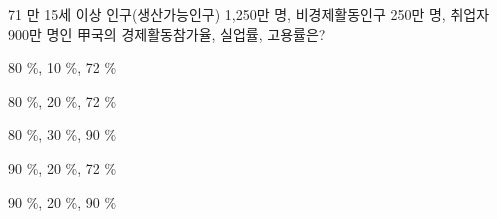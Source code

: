 \begin{question}{71}
만 15세 이상 인구(생산가능인구) 1,250만 명, 비경제활동인구 250만 명, 취업자 900만 명인 甲국의 경제활동참가율, 실업률, 고용률은?
\begin{choices}
  \item 80 \%, 10 \%, 72 \%
  \item 80 \%, 20 \%, 72 \%
  \item 80 \%, 30 \%, 90 \%
  \item 90 \%, 20 \%, 72 \%
  \item 90 \%, 20 \%, 90 \%
\end{choices}
\end{question}
